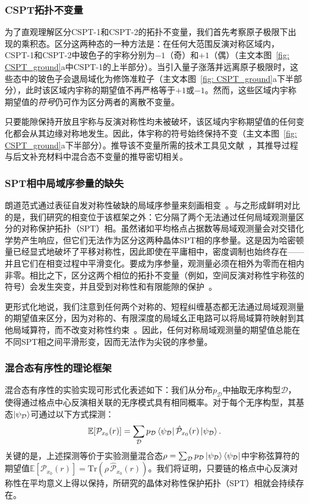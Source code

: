 \documentclass[preprint,superscriptaddress,floatfix, nofootinbib]{revtex4-2}
\begin{document}
\subsubsection*{CSPT拓扑不变量}

为了直观理解区分CSPT-1和CSPT-2的拓扑不变量，我们首先考察原子极限下出现的乘积态。区分这两种态的一种方法是：在任何大范围反演对称区域内，CSPT-1和CSPT-2中玻色子的宇称分别为$-1$（奇）和$+1$（偶）（主文本图~\ref{fig: CSPT_ground}a中CSPT-1的上半部分）。当引入量子涨落并远离原子极限时，这些态中的玻色子会退局域化为修饰准粒子（主文本图~\ref{fig: CSPT_ground}a下半部分），此时该区域内宇称的期望值不再严格等于$+1$或$-1$。然而，这些区域内宇称期望值的\textit{符号}仍可作为区分两者的离散不变量。

只要能隙保持开放且宇称与反演对称性均未被破坏，该区域内宇称期望值的任何变化都会从其边缘对称地发生。因此，体宇称的符号始终保持不变（主文本图~\ref{fig: CSPT_ground}a下半部分）。推导该不变量所需的技术工具见文献~\cite{Fuji2015}，其推导过程与后文补充材料中混合态不变量的推导密切相关。
\subsubsection*{SPT相中局域序参量的缺失}
朗道范式通过表征自发对称性破缺的局域序参量来刻画相变~\cite{Landau1937, Beekman2019}。与之形成鲜明对比的是，我们研究的相变位于该框架之外：它分隔了两个无法通过任何局域观测量区分的对称保护拓扑（SPT）相。虽然诸如平均格点占据数等局域观测量会对交错化学势产生响应，但它们无法作为区分这两种晶体SPT相的序参量。这是因为哈密顿量已经显式地破坏了平移对称性，因此即使在平庸相中，密度调制也始终存在——并且它们在相变过程中平滑变化。要成为序参量，观测量必须在相外为零而在相内非零。相比之下，区分这两个相位的拓扑不变量（例如，空间反演对称性宇称弦的符号）会发生突变，并且受到对称性和有限能隙的保护~\cite{Fuji2015, Pollmann2012}。

更形式化地说，我们注意到任何两个对称的、短程纠缠基态都无法通过局域观测量的期望值来区分，因为对称的、有限深度的局域幺正电路可以将局域算符映射到其他局域算符，而不改变对称性约束~\cite{Chen2010, Chen2011}。因此，任何对称局域观测量的期望值总能在不同SPT相之间平滑形变，因而无法作为尖锐的序参量。
\subsubsection*{混合态有序性的理论框架}
混合态有序性的实验实现可形式化表述如下：我们从分布$p_{\mathcal{D}}$中抽取无序构型$\mathcal{D}$，使得通过格点中心反演相关联的无序模式具有相同概率。对于每个无序构型，其基态$\ket{\psi_{\mathcal{D}}}$可通过以下方式探测：
\begin{equation}
    \mathbb{E}[\mathcal{P}_{x_0}(r)] = \sum_{\mathcal{D}} p_{\mathcal{D}} \bra{\psi_{\mathcal{D}}} \hat{\mathcal{P}}_{x_0}(r)\ket{\psi_{\mathcal{D}}}.
\end{equation}
关键的是，上述探测等价于实验测量混合态$\rho = \sum_{\mathcal{D}} p_{\mathcal{D}} \ket{\psi_{\mathcal{D}}} \bra{\psi_{\mathcal{D}}}$中宇称弦算符的期望值$\mathbb{E}[\mathcal{P}_{x_0}(r)] = \text{Tr}\left( \rho\,  \hat{\mathcal{P}}_{x_0}(r)\right)$。我们将证明，只要链的格点中心反演对称性在平均意义上得以保持，所研究的晶体对称性保护拓扑（SPT）相就会持续存在。
\end{document}
